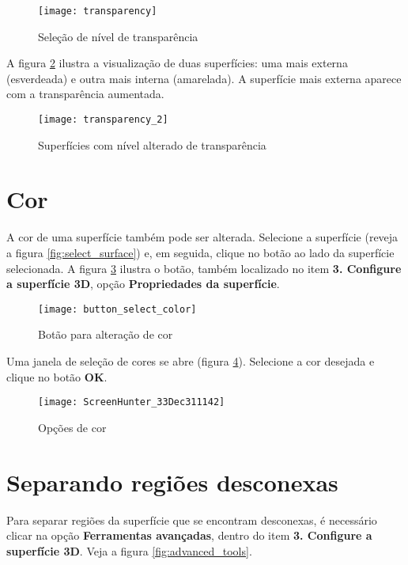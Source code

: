 \begin{figure}[!htb]
\centering
\texttt{[image: transparency]}
\caption{Seleção de nível de transparência}
\label{fig:select_transparency}
\end{figure}

A figura \ref{fig:model_transparency} ilustra a visualização de duas superfícies: uma mais externa
(esverdeada) e outra mais interna (amarelada). A superfície mais externa aparece com a transparência
aumentada.

\begin{figure}[!htb]
\centering
\texttt{[image: transparency\_2]}
\caption{Superfícies com nível alterado de transparência}
\label{fig:model_transparency}
\end{figure}

\newpage

\section{Cor}

A cor de uma superfície também pode ser alterada. Selecione a superfície (reveja a figura
\ref{fig:select_surface}) e, em seguida, clique no botão ao lado da superfície selecionada. A figura
\ref{fig:change_surface_color} ilustra o botão, também localizado no item \textbf{3. Configure a
superfície 3D}, opção \textbf{Propriedades da superfície}.

\begin{figure}[!htb]
\centering
\texttt{[image: button\_select\_color]}
\caption{Botão para alteração de cor}
\label{fig:change_surface_color}
\end{figure}

Uma janela de seleção de cores se abre (figura \ref{fig:button_select_color}). Selecione a cor
desejada e clique no botão \textbf{OK}.

\begin{figure}[!htb]
\centering
\texttt{[image: ScreenHunter\_33Dec311142]}
\caption{Opções de cor}
\label{fig:button_select_color}
\end{figure}

\section{Separando regiões desconexas}

Para separar regiões da superfície que se encontram desconexas, é necessário clicar na opção
\textbf{Ferramentas avançadas}, dentro do item \textbf{3. Configure a superfície 3D}. Veja a
figura \ref{fig:advanced_tools}.

